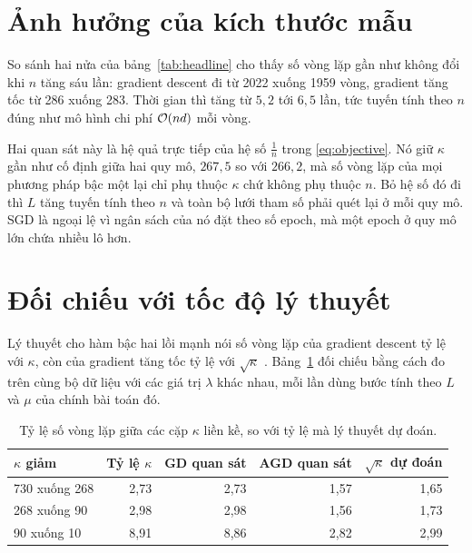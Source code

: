 \documentclass[12pt, a4paper, oneside]{report}
\theoremstyle{definition}
\begin{document}


\section{Ảnh hưởng của kích thước mẫu}

So sánh hai nửa của bảng~\ref{tab:headline} cho thấy số vòng lặp gần như không
đổi khi $n$ tăng sáu lần: gradient descent đi từ 2022 xuống 1959 vòng, gradient
tăng tốc từ 286 xuống 283. Thời gian thì tăng từ $5{,}2$ tới $6{,}5$ lần, tức
tuyến tính theo $n$ đúng như mô hình chi phí $\mathcal{O}(nd)$ mỗi vòng.

Hai quan sát này là hệ quả trực tiếp của hệ số $\frac{1}{n}$ trong
\eqref{eq:objective}. Nó giữ $\kappa$ gần như cố định giữa hai quy mô, $267{,}5$
so với $266{,}2$, mà số vòng lặp của mọi phương pháp bậc một lại chỉ phụ thuộc
$\kappa$ chứ không phụ thuộc $n$. Bỏ hệ số đó đi thì $L$ tăng tuyến tính theo $n$
và toàn bộ lưới tham số phải quét lại ở mỗi quy mô. SGD là ngoại lệ vì ngân sách
của nó đặt theo số epoch, mà một epoch ở quy mô lớn chứa nhiều lô hơn.

\section{Đối chiếu với tốc độ lý thuyết}

Lý thuyết cho hàm bậc hai lồi mạnh nói số vòng lặp của gradient descent tỷ lệ với
$\kappa$, còn của gradient tăng tốc tỷ lệ với $\sqrt{\kappa}$
\cite{nesterov2018lectures}. Bảng~\ref{tab:theory} đối chiếu bằng cách đo trên
cùng bộ dữ liệu với các giá trị $\lambda$ khác nhau, mỗi lần dùng bước tính theo
$L$ và $\mu$ của chính bài toán đó.

\begin{table}[tbp]
  \centering
  \caption{Tỷ lệ số vòng lặp giữa các cặp $\kappa$ liền kề, so với tỷ lệ mà lý
    thuyết dự đoán.}
  \label{tab:theory}
  \begin{tabular}{lrrrr}
    \toprule
    $\kappa$ giảm & Tỷ lệ $\kappa$ & GD quan sát & AGD quan sát & $\sqrt{\kappa}$ dự đoán \\
    \midrule
    730 xuống 268 & 2{,}73 & 2{,}73 & 1{,}57 & 1{,}65 \\
    268 xuống 90  & 2{,}98 & 2{,}98 & 1{,}56 & 1{,}73 \\
    90 xuống 10   & 8{,}91 & 8{,}86 & 2{,}82 & 2{,}99 \\
    \bottomrule
  \end{tabular}
\end{table}
\end{document}

